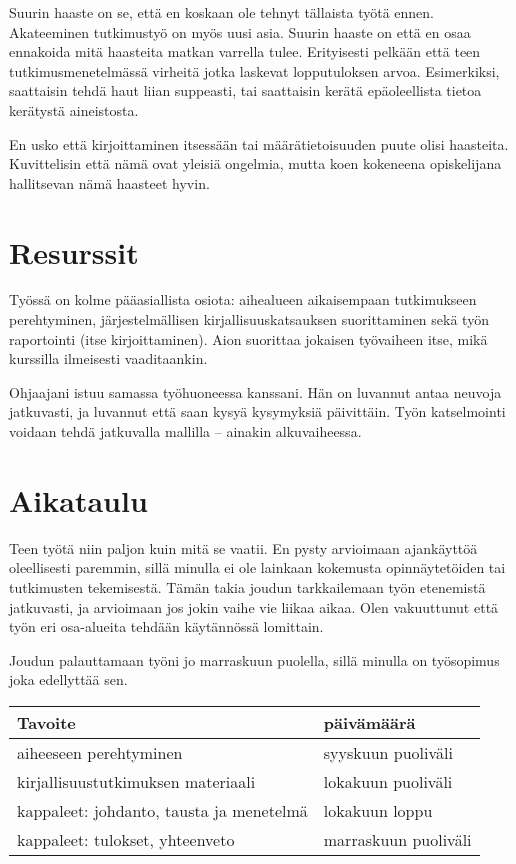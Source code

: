 \documentclass[12pt,a4paper,finnish,oneside]{article}
\begin{document}
Suurin haaste on se, että en koskaan ole tehnyt tällaista työtä ennen.
Akateeminen tutkimustyö on myös uusi asia. Suurin haaste on että en osaa
ennakoida mitä haasteita matkan varrella tulee. Erityisesti pelkään että teen
tutkimusmenetelmässä virheitä jotka laskevat lopputuloksen arvoa. Esimerkiksi,
saattaisin tehdä haut liian suppeasti, tai saattaisin kerätä epäoleellista
tietoa kerätystä aineistosta.

En usko että kirjoittaminen itsessään tai määrätietoisuuden puute olisi
haasteita. Kuvittelisin että nämä ovat yleisiä ongelmia, mutta koen kokeneena
opiskelijana hallitsevan nämä haasteet hyvin.


\section{Resurssit}

Työssä on kolme pääasiallista osiota: aihealueen aikaisempaan tutkimukseen
perehtyminen, järjestelmällisen kirjallisuuskatsauksen suorittaminen sekä
työn raportointi (itse kirjoittaminen). Aion suorittaa jokaisen työvaiheen
itse, mikä kurssilla ilmeisesti vaaditaankin.

Ohjaajani istuu samassa työhuoneessa kanssani. Hän on luvannut antaa neuvoja
jatkuvasti, ja luvannut että saan kysyä kysymyksiä päivittäin. Työn katselmointi
voidaan tehdä jatkuvalla mallilla -- ainakin alkuvaiheessa.

\section{Aikataulu}

Teen työtä niin paljon kuin mitä se vaatii. En pysty arvioimaan ajankäyttöä
oleellisesti paremmin, sillä minulla ei ole lainkaan kokemusta opinnäytetöiden
tai tutkimusten tekemisestä. Tämän takia joudun tarkkailemaan työn etenemistä
jatkuvasti, ja arvioimaan jos jokin vaihe vie liikaa aikaa. Olen vakuuttunut
että työn eri osa-alueita tehdään käytännössä lomittain.

Joudun palauttamaan työni jo marraskuun puolella, sillä minulla on työsopimus
joka edellyttää sen.

\begin{table}[h]
    \begin{tabular}{|l|l|}
	\hline
    Tavoite   & päivämäärä \\ \hline
    aiheeseen perehtyminen   & syyskuun puoliväli \\
    kirjallisuustutkimuksen materiaali  & lokakuun puoliväli \\ 
    kappaleet: johdanto, tausta ja menetelmä   & lokakuun loppu \\ 
    kappaleet: tulokset, yhteenveto   & marraskuun puoliväli \\ 
	\hline
	\end{tabular}
\end{table}
\end{document}
